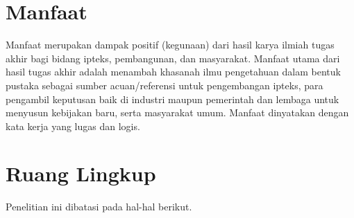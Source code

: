 \section{Manfaat}

Manfaat merupakan dampak positif (kegunaan) dari hasil karya ilmiah tugas akhir
bagi bidang ipteks, pembangunan, dan masyarakat. Manfaat utama dari hasil tugas
akhir adalah menambah khasanah ilmu pengetahuan dalam bentuk pustaka sebagai
sumber acuan/referensi untuk pengembangan ipteks, para pengambil keputusan baik
di industri maupun pemerintah dan lembaga untuk menyusun kebijakan baru, serta
masyarakat umum. Manfaat dinyatakan dengan kata kerja yang lugas dan logis.

\section{Ruang Lingkup}

Penelitian ini dibatasi pada hal-hal berikut.

